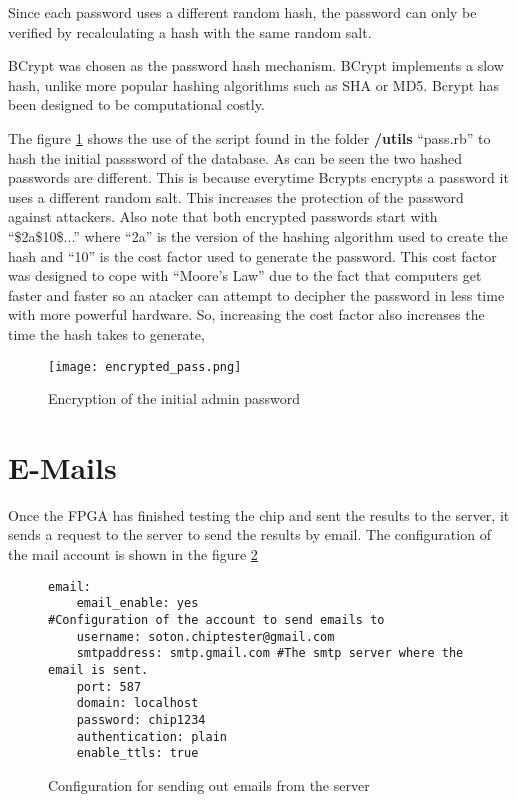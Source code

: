 Since each password uses a different random hash, the password can only be verified
by recalculating a hash with the same random salt.

BCrypt was chosen as the password hash mechanism. BCrypt implements a slow hash,
unlike more popular hashing algorithms such as SHA or MD5. Bcrypt has been designed to
be computational costly.

The figure \ref{fig:initial_pass} shows the use of the script found in the folder {\bf /utils} ``pass.rb'' to hash the initial passsword of the database. As can be seen the two hashed passwords are different. This is because everytime Bcrypts encrypts a password it uses a different random salt.
This increases the protection of the password against attackers. Also note that both encrypted passwords start with ``\$2a\$10\$...'' where ``2a'' is the version of the hashing algorithm used to create the hash and ``10'' is the cost factor used to generate the password. This cost factor
was designed to cope with ``Moore's Law'' due to the fact that computers get faster and faster so an atacker can attempt to decipher the password in less time with more powerful hardware. So, increasing the cost factor also increases the time the hash takes to generate,

\begin{figure}[htb]
\centering
\texttt{[image: encrypted\_pass.png]}
\caption{Encryption of the initial admin password}
\label{fig:initial_pass}
\end{figure}


\section{E-Mails}
Once the FPGA has finished testing the chip and sent the results to the server,
it sends a request to the server to send the results by email.
The configuration of the mail account is shown in the figure \ref{fig:email_server}

\begin{figure}[htb]
\lstset{basicstyle=\scriptsize\ttfamily}
\begin{lstlisting}
email:
    email_enable: yes
#Configuration of the account to send emails to
    username: soton.chiptester@gmail.com
    smtpaddress: smtp.gmail.com #The smtp server where the email is sent.
    port: 587
    domain: localhost
    password: chip1234
    authentication: plain
    enable_ttls: true
\end{lstlisting}
\caption{Configuration for sending out emails from the server}
\label{fig:email_server}
\end{figure}

